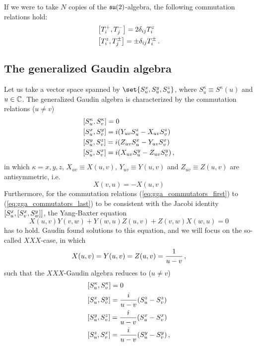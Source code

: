         If we were to take $N$ copies of the $\operatorname{\mathfrak{su}}(2)$-algebra, the following commutation relations hold:
        \begin{align}
            & \comm{T^+_i}{T^-_j} = 2 \delta_{ij} T^z_i \\
            & \comm{T^z_i}{T^\pm_j} = \pm \delta_{ij} T^\pm_i \thinspace .
        \end{align}

    \subsection{The generalized Gaudin algebra}
        Let us take a vector space spanned by $\set{S^x_u, S^y_u, S^z_u}$, where $S^\kappa_u \equiv S^\kappa(u)$ and $u \in \mathbb{C}$. The generalized Gaudin algebra is characterized by the commutation relations ($u \neq v$)
        \begin{align}
            & \comm{S^\kappa_u}{S^\kappa_v} = 0 \label{eq:gga_commutators_first} \\
            & \comm{S^x_u}{S^y_v} = i \qty( Y_{uv} S^z_u - X_{uv} S^z_v ) \\
            & \comm{S^y_u}{S^z_v} = i \qty( Z_{uv} S^x_u - Y_{uv} S^x_v ) \\
            & \comm{S^z_u}{S^x_v} = i \qty( X_{uv} S^y_u - Z_{uv} S^y_v ) \label{eq:gga_commutators_last} \thinspace ,
        \end{align}
        in which $\kappa=x,y,z$, $X_{uv} \equiv X(u,v)$, $Y_{uv} \equiv Y(u,v)$ and $Z_{uv} \equiv Z(u,v)$ are antisymmetric, i.e.
        \begin{equation}
            X(v, u) = - X(u, v)
        \end{equation}
        Furthermore, for the commutation relations (\ref{eq:gga_commutators_first}) to (\ref{eq:gga_commutators_last}) to be consistent with the Jacobi identity $\comm{S^x_u}{\comm{S^x_v}{S^y_w}}$, the Yang-Baxter equation
        \begin{equation}
            X(u, v) Y(v, w) + Y(w, u) Z(u, v) + Z(v, w) X(w, u) = 0
        \end{equation}
        has to hold. Gaudin \cite{gaudin1976} found solutions to this equation, and we will focus on the so-called $XXX$-case, in which
        \begin{equation}
            X(u, v) = Y(u, v) = Z(u, v) = \frac{1}{u - v} \thinspace ,
        \end{equation}
        such that the $XXX$-Gaudin algebra reduces to ($u \neq v$)
        \begin{align}
            & \comm{S^\kappa_u}{S^\kappa_v} = 0 \\
            & \comm{S^x_u}{S^y_v} = \frac{i}{u-v} \qty(S^z_u - S^z_v) \\
            & \comm{S^y_u}{S^z_v} = \frac{i}{u-v} \qty(S^x_u - S^x_v) \\
            & \comm{S^z_u}{S^x_v} = \frac{i}{u-v} \qty(S^y_u - S^y_v) \thinspace ,
        \end{align}
